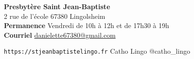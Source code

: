 \begin{framed}
\textbf{Presbytère Saint Jean-Baptiste} \\
2 rue de l'école 67380 Lingolsheim  \\
\textbf{Permanence} Vendredi de 10h à 12h et de 17h30 à 19h\\
\textbf{Courriel} \href{mailto:danielette67380@gmail.com}{danielette67380@gmail.com}


\texttt{https://stjeanbaptistelingo.fr} \hfill \faFacebook Catho Lingo \hfill \faInstagram @catho\_lingo
\end{framed}

